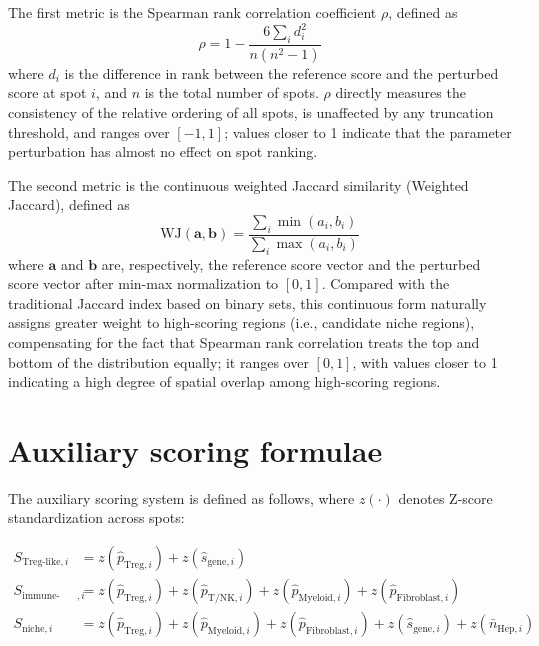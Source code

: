 \documentclass[12pt, a4paper]{article}
\begin{document}
The first metric is the Spearman rank correlation coefficient $\rho$, defined as
\begin{equation}
\rho = 1 - \frac{6 \sum_i d_i^2}{n(n^2-1)}
\label{eq:spearman}
\end{equation}
where $d_i$ is the difference in rank between the reference score and the perturbed score at spot $i$, and $n$ is the total number of spots. $\rho$ directly measures the consistency of the relative ordering of all spots, is unaffected by any truncation threshold, and ranges over $[-1, 1]$; values closer to 1 indicate that the parameter perturbation has almost no effect on spot ranking.

The second metric is the continuous weighted Jaccard similarity (Weighted Jaccard), defined as
\begin{equation}
\text{WJ}(\mathbf{a}, \mathbf{b}) = \frac{\sum_i \min(a_i, b_i)}{\sum_i \max(a_i, b_i)}
\label{eq:weighted_jaccard}
\end{equation}
where $\mathbf{a}$ and $\mathbf{b}$ are, respectively, the reference score vector and the perturbed score vector after min-max normalization to $[0,1]$. Compared with the traditional Jaccard index based on binary sets, this continuous form naturally assigns greater weight to high-scoring regions (i.e., candidate niche regions), compensating for the fact that Spearman rank correlation treats the top and bottom of the distribution equally; it ranges over $[0, 1]$, with values closer to 1 indicating a high degree of spatial overlap among high-scoring regions.

\section{Auxiliary scoring formulae}
\label{app:scores}

The auxiliary scoring system is defined as follows, where $z(\cdot)$ denotes Z-score standardization across spots:

\begin{align}
S_{\text{Treg-like},i} &= z(\hat{p}_{\text{Treg},i}) + z(\hat{s}_{\text{gene},i}) \\
S_{\text{immune-stroma},i} &= z(\hat{p}_{\text{Treg},i}) + z(\hat{p}_{\text{T/NK},i}) + z(\hat{p}_{\text{Myeloid},i}) + z(\hat{p}_{\text{Fibroblast},i}) \\
S_{\text{niche},i} &= z(\hat{p}_{\text{Treg},i}) + z(\hat{p}_{\text{Myeloid},i}) + z(\hat{p}_{\text{Fibroblast},i}) + z(\hat{s}_{\text{gene},i}) + z(\bar{n}_{\text{Hep},i})
\end{align}
\end{document}
